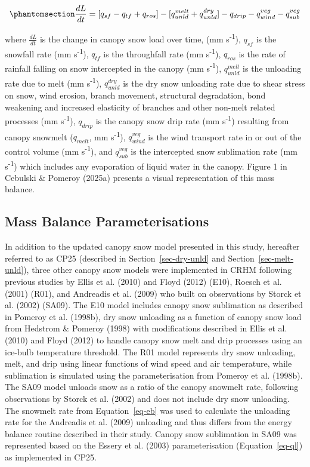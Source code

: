 \documentclass[
]{agujournal2019}
\begin{document}
\begin{equation}\phantomsection\label{eq-canopy-mass-bal}{
\frac{dL}{dt} = 
[q_{sf} - q_{tf} + q_{ros}] - [q_{unld}^{melt} + q_{unld}^{dry}] - q_{drip} - q_{wind}^{veg} - q_{sub}^{veg}
}\end{equation}

where \(\frac{dL}{dt}\) is the change in canopy snow load over time, (mm
s\textsuperscript{-1}), \(q_{sf}\) is the snowfall rate (mm
s\textsuperscript{-1}), \(q_{tf}\) is the throughfall rate (mm
s\textsuperscript{-1}), \(q_{ros}\) is the rate of rainfall falling on
snow intercepted in the canopy (mm s\textsuperscript{-1}),
\(q_{unld}^{melt}\) is the unloading rate due to melt (mm
s\textsuperscript{-1}), \(q_{unld}^{dry}\) is the dry snow unloading
rate due to shear stress on snow, wind erosion, branch movement,
structural degradation, bond weakening and increased elasticity of
branches and other non-melt related processes (mm
s\textsuperscript{-1}), \(q_{drip}\) is the canopy snow drip rate (mm
s\textsuperscript{-1}) resulting from canopy snowmelt (\(q_{melt}\), mm
s\textsuperscript{-1}), \(q_{wind}^{veg}\) is the wind transport rate in
or out of the control volume (mm s\textsuperscript{-1}), and
\(q_{sub}^{veg}\) is the intercepted snow sublimation rate (mm
s\textsuperscript{-1}) which includes any evaporation of liquid water in
the canopy. Figure 1 in Cebulski \& Pomeroy (2025a) presents a visual
representation of this mass balance.

\subsection{Mass Balance
Parameterisations}\label{mass-balance-parameterisations}

In addition to the updated canopy snow model presented in this study,
hereafter referred to as CP25 (described in Section~\ref{sec-dry-unld}
and Section~\ref{sec-melt-unld}), three other canopy snow models were
implemented in CRHM following previous studies by Ellis et al. (2010)
and Floyd (2012) (E10), Roesch et al. (2001) (R01), and Andreadis et al.
(2009) who built on observations by Storck et al. (2002) (SA09). The E10
model includes canopy snow sublimation as described in Pomeroy et al.
(1998b), dry snow unloading as a function of canopy snow load from
Hedstrom \& Pomeroy (1998) with modifications described in Ellis et al.
(2010) and Floyd (2012) to handle canopy snow melt and drip processes
using an ice-bulb temperature threshold. The R01 model represents dry
snow unloading, melt, and drip using linear functions of wind speed and
air temperature, while sublimation is simulated using the
parameterisation from Pomeroy et al. (1998b). The SA09 model unloads
snow as a ratio of the canopy snowmelt rate, following observations by
Storck et al. (2002) and does not include dry snow unloading. The
snowmelt rate from Equation~\ref{eq-eb} was used to calculate the
unloading rate for the Andreadis et al. (2009) unloading and thus
differs from the energy balance routine described in their study. Canopy
snow sublimation in SA09 was represented based on the Essery et al.
(2003) parameterisation (Equation~\ref{eq-ql}) as implemented in CP25.
\end{document}
